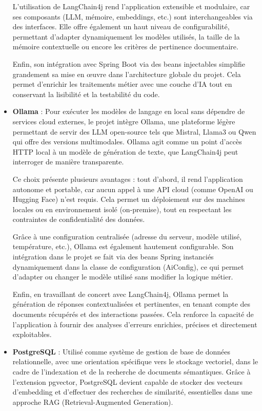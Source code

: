 \documentclass[12pt,a4paper]{report}
\begin{document}
\begin{itemize}
		L’utilisation de LangChain4j rend l’application extensible et modulaire, car ses composants (LLM, mémoire, embeddings, etc.) sont interchangeables via des interfaces. Elle offre également un haut niveau de configurabilité, permettant d’adapter dynamiquement les modèles utilisés, la taille de la mémoire contextuelle ou encore les critères de pertinence documentaire.
		
		Enfin, son intégration avec Spring Boot via des beans injectables simplifie grandement sa mise en œuvre dans l’architecture globale du projet. Cela permet d’enrichir les traitements métier avec une couche d’IA tout en conservant la lisibilité et la testabilité du code.
		
		\item \textbf{Ollama} : Pour exécuter les modèles de langage en local sans dépendre de services cloud externes, le projet intègre Ollama, une plateforme légère permettant de servir des LLM open-source tels que Mistral, Llama3 ou Qwen qui offre des versions multimodales. Ollama agit comme un point d’accès HTTP local à un modèle de génération de texte, que LangChain4j peut interroger de manière transparente.
		
		Ce choix présente plusieurs avantages : tout d’abord, il rend l’application autonome et portable, car aucun appel à une API cloud (comme OpenAI ou Hugging Face) n’est requis. Cela permet un déploiement sur des machines locales ou en environnement isolé (on-premise), tout en respectant les contraintes de confidentialité des données.
		
		Grâce à une configuration centralisée (adresse du serveur, modèle utilisé, température, etc.), Ollama est également hautement configurable. Son intégration dans le projet se fait via des beans Spring instanciés dynamiquement dans la classe de configuration (AiConfig), ce qui permet d’adapter ou changer le modèle utilisé sans modifier la logique métier.
		
		Enfin, en travaillant de concert avec LangChain4j, Ollama permet la génération de réponses contextualisées et pertinentes, en tenant compte des documents récupérés et des interactions passées. Cela renforce la capacité de l'application à fournir des analyses d'erreurs enrichies, précises et directement exploitables.
		
		\item \textbf{PostgreSQL} : Utilisé comme système de gestion de base de données relationnelle, avec une orientation spécifique vers le stockage vectoriel, dans le cadre de l’indexation et de la recherche de documents sémantiques. Grâce à l’extension pgvector, PostgreSQL devient capable de stocker des vecteurs d’embedding et d’effectuer des recherches de similarité, essentielles dans une approche RAG (Retrieval-Augmented Generation).
		

\end{itemize}
\end{document}
